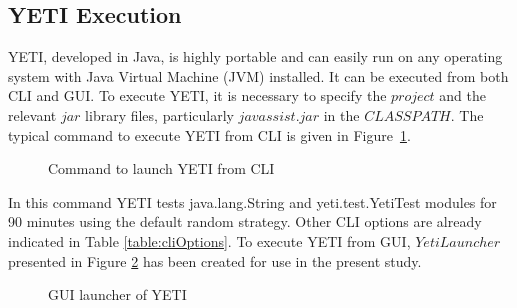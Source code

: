 \subsection{YETI Execution}
YETI, developed in Java, is highly portable and can easily run on any operating system with Java Virtual Machine (JVM) installed. It can be executed from both CLI and GUI. To execute YETI, it is necessary to specify the $project$ and the relevant $jar$ library files, particularly $javassist.jar$ in the $CLASSPATH$. The typical command to execute YETI from CLI is given in Figure~\ref{fig:yeticommand}.

\begin{figure}[h!]
	\centering
	\caption{Command to launch YETI from CLI}
	\label{fig:yeticommand}
\end{figure}

 In this command YETI tests java.lang.String and yeti.test.YetiTest modules for 90 minutes using the default random strategy. Other CLI options are already indicated in Table \ref{table:cliOptions}. To execute YETI from GUI, $YetiLauncher$ presented in Figure \ref{fig:yetiLauncher} has been created for use in the present study.

\begin{figure}[h]
	\centering
	\caption{GUI launcher of YETI}
	\label{fig:yetiLauncher}
\end{figure}


